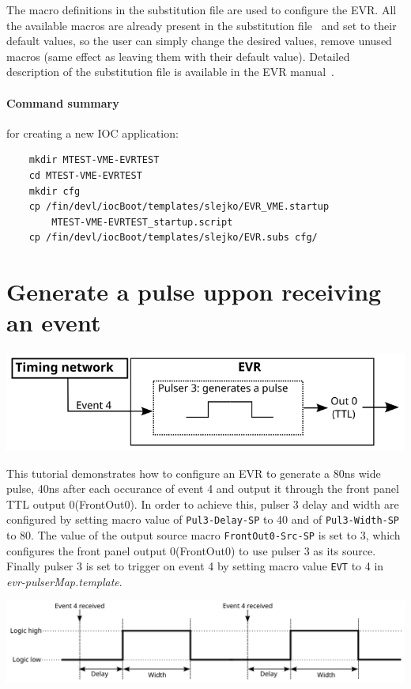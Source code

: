\documentclass[12pt,a4paper]{article}
\begin{document}
The macro definitions in the substitution file are used to configure the EVR. All the available macros are already present in the substitution file~\cite{substitution_git} and set to their default values, so the user can simply change the desired values, remove unused macros (same effect as leaving them with their default value). Detailed description of the substitution file is available in the EVR manual~\cite{evr_manual}.

\paragraph{Command summary} for creating a new IOC application:
\begin{verbatim}
	mkdir MTEST-VME-EVRTEST
	cd MTEST-VME-EVRTEST
	mkdir cfg
	cp /fin/devl/iocBoot/templates/slejko/EVR_VME.startup 
	    MTEST-VME-EVRTEST_startup.script
	cp /fin/devl/iocBoot/templates/slejko/EVR.subs cfg/
\end{verbatim}

\section{Generate a pulse uppon receiving an event}
	\includegraphics[]{./img/pulser}
	
This tutorial demonstrates how to configure an EVR to generate a 80ns wide pulse, 40ns after each occurance of event 4 and output it through the front panel TTL output 0(FrontOut0). In order to achieve this, pulser 3 delay and width are configured by setting macro value of \texttt{Pul3-Delay-SP} to 40 and of \texttt{Pul3-Width-SP} to 80. The value of the output source macro \texttt{FrontOut0-Src-SP} is set to 3, which configures the front panel output 0(FrontOut0) to use pulser 3 as its source. Finally pulser 3 is set to trigger on event 4 by setting macro value \texttt{EVT} to 4 in \textit{evr-pulserMap.template}. 

	\includegraphics[width=\columnwidth]{./img/pulserSignal}
\end{document}
